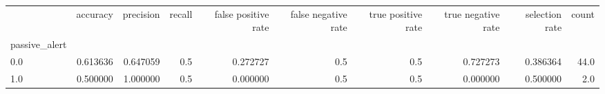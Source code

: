 \begin{tabular}{lrrrrrrrrr}
\toprule
{} &  accuracy &  precision &  recall &  false positive rate &  false negative rate &  true positive rate &  true negative rate &  selection rate &  count \\
passive\_alert &           &            &         &                      &                      &                     &                     &                 &        \\
\midrule
0.0           &  0.613636 &   0.647059 &     0.5 &             0.272727 &                  0.5 &                 0.5 &            0.727273 &        0.386364 &   44.0 \\
1.0           &  0.500000 &   1.000000 &     0.5 &             0.000000 &                  0.5 &                 0.5 &            0.000000 &        0.500000 &    2.0 \\
\bottomrule
\end{tabular}
